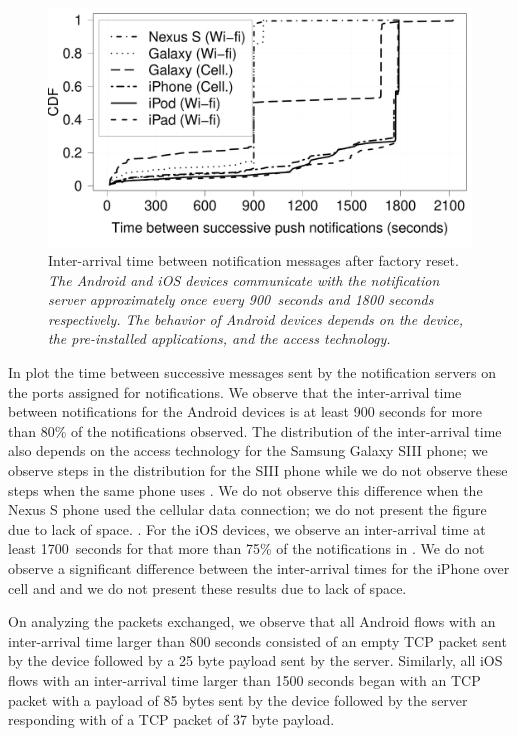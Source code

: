 \begin{figure}
\centering
\includegraphics[width=\columnwidth]{plots/push_factoryreset_interarrival_distrib.pdf}
\caption{Inter-arrival time between notification messages after factory reset. \emph{The Android and iOS devices communicate with the notification server approximately once every 900~seconds and 1800 seconds respectively. The behavior of Android devices depends on the device, the pre-installed applications, and the access technology.}}
\label{fig:push-expt-interarrival}
\end{figure}

In  plot the time between successive messages sent by the notification servers on the ports assigned for notifications. 
We observe that the inter-arrival time between notifications for the Android devices is at least 900 seconds for more than 80\% of the notifications observed. 
The distribution of the inter-arrival time also depends on the access technology for the Samsung Galaxy SIII phone; we observe steps in the distribution for the SIII phone while we do not observe these steps when the same phone uses \wifi. 
We do not observe this difference when the Nexus S phone used the cellular data connection; we do not present the figure due to lack of space. 
.
For the iOS devices, we observe an inter-arrival time at least 1700~seconds for that more than 75\% of the notifications in . 
We do not observe a significant difference between the inter-arrival times for the iPhone over cell and \wifi and we do not present these results due to lack of space. 

On analyzing the packets exchanged, we observe that  all Android flows with an inter-arrival time larger than 800 seconds consisted of an empty TCP packet sent by the device followed by a 25 byte payload sent by the server.
Similarly, all iOS flows with an inter-arrival time larger than 1500 seconds began with an TCP packet with a payload of 85 bytes sent by the device followed by the server responding with of a TCP packet of 37 byte payload.

